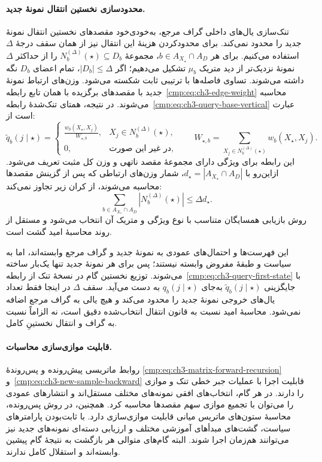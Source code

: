 \paragraph{محدودسازی نخستین انتقال نمونهٔ جدید.}
تنک‌سازی یال‌های داخلی گراف مرجع، به‌خودی‌خود
مقصدهای نخستین انتقال نمونهٔ جدید را محدود نمی‌کند.
برای محدودکردن هزینهٔ این انتقال نیز از همان سقف
درجهٔ $\Delta$ استفاده می‌کنیم. برای هر
$b\in A_{X_\star}\cap A_D$، مجموعهٔ
$N_b^{(\Delta)}(\star)\subseteq D_b$ را از
حداکثر $\Delta$ نمونهٔ نزدیک‌تر از دید متریک
$\mu_b$ تشکیل می‌دهیم؛ اگر $|D_b|\le\Delta$،
تمام اعضای $D_b$ نگه داشته می‌شوند. تساوی فاصله‌ها
با ترتیبی ثابت شکسته می‌شود. وزن‌های ارتباط
نمونهٔ جدید با مقصدهای برگزیده با همان تابع
رابطه~\eqref{cmp:eq:ch3-edge-weight} محاسبه می‌شوند.
در نتیجه، همتای تنک‌شدهٔ
رابطه~\eqref{cmp:eq:ch3-query-base-vertical}
عبارت است از:
\begin{equation}\label{cmp:eq:ch3-query-sparse-vertical}
\boxed{
\widetilde q_b(j\mid\star)=
\begin{cases}
\displaystyle\frac{w_b(X_\star,X_j)}{W_{\star,b}},
&X_j\in N_b^{(\Delta)}(\star),\\[5pt]
0,&\text{در غیر این صورت},
\end{cases}
\qquad
W_{\star,b}=\sum_{X_j\in N_b^{(\Delta)}(\star)}
w_b(X_\star,X_j).
}
\end{equation}
این رابطه برای ویژگی دارای مجموعهٔ مقصد ناتهی
و وزن کل مثبت تعریف می‌شود. ازاین‌رو با
$d_\star=|A_{X_\star}\cap A_D|$، شمار وزن‌های
ارتباطی که پس از گزینش مقصدها محاسبه می‌شوند،
از کران زیر تجاوز نمی‌کند:
\begin{equation}\label{cmp:eq:ch3-query-weight-count}
\boxed{
\sum_{b\in A_{X_\star}\cap A_D}
|N_b^{(\Delta)}(\star)|
\le \Delta d_\star.
}
\end{equation}
روش بازیابی همسایگان متناسب با نوع ویژگی
و متریک آن انتخاب می‌شود و مستقل از روند محاسبهٔ
امید گشت است.

این فهرست‌ها و احتمال‌های عمودی به نمونهٔ جدید
و گراف مرجع وابسته‌اند، اما به سیاست و طبقهٔ مفروض
وابسته نیستند؛ پس برای هر نمونهٔ جدید تنها یک‌بار
ساخته می‌شوند. توزیع نخستین گام در نسخهٔ تنک
از رابطه~\eqref{cmp:eq:ch3-query-first-state}
با جایگزینی $\widetilde q_b(j\mid\star)$
به‌جای $q_b(j\mid\star)$ به دست می‌آید.
سقف $\Delta$ در اینجا فقط تعداد یال‌های خروجی
نمونهٔ جدید را محدود می‌کند و هیچ یالی به گراف
مرجع اضافه نمی‌شود. محاسبهٔ امید نسبت به قانون
انتقال انتخاب‌شده دقیق است، نه الزاماً نسبت به
گراف و انتقال نخستینِ کامل.

\paragraph{قابلیت موازی‌سازی محاسبات.}
روابط ماتریسی پیش‌رونده و
پس‌روندهٔ
\eqref{cmp:eq:ch3-matrix-forward-recursion}
و~\eqref{cmp:eq:ch3-new-sample-backward}
قابلیت اجرا با عملیات جبر خطی
تنک و موازی را دارند.
در هر گام، انتخاب‌های افقی
نمونه‌های مختلف مستقل‌اند و
انتشارهای عمودی را می‌توان
با تجمیع موازی سهم مقصدها
محاسبه کرد. همچنین، در روش
پس‌رونده، محاسبهٔ ستون‌های
ماتریس میانی قابلیت موازی‌سازی
دارد. با ثابت‌بودن پارامترهای
سیاست، گشت‌های مبدأهای آموزشی
مختلف و ارزیابی دسته‌ای
نمونه‌های جدید نیز می‌توانند
هم‌زمان اجرا شوند. البته
گام‌های متوالی هر بازگشت به
نتیجهٔ گام پیشین وابسته‌اند
و استقلال کامل ندارند.

